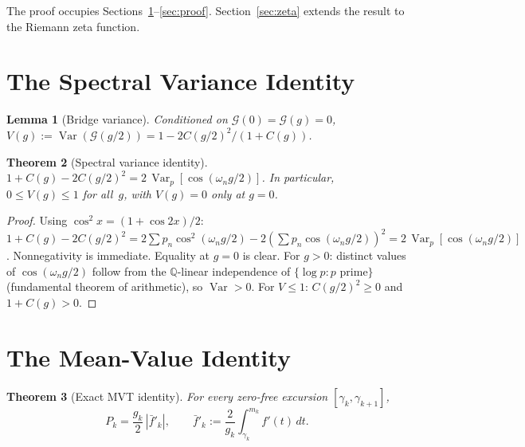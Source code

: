 \documentclass[11pt]{article}
\newtheorem{theorem}{Theorem}
\newtheorem{lemma}[theorem]{Lemma}
\DeclareMathOperator{\Var}{Var}
\begin{document}
The proof occupies Sections~\ref{sec:spectral}--\ref{sec:proof}.
Section~\ref{sec:zeta} extends the result to the Riemann zeta function.


\section{The Spectral Variance Identity}\label{sec:spectral}

\begin{lemma}[Bridge variance]\label{lem:bridge}
Conditioned on $\mathcal{G}(0) = \mathcal{G}(g) = 0$,
$V(g) := \Var(\mathcal{G}(g/2)) = 1 - 2C(g/2)^2/(1+C(g))$.
\end{lemma}

\begin{theorem}[Spectral variance identity]\label{thm:svi}
$1 + C(g) - 2C(g/2)^2 = 2\,\Var_{\!p}[\cos(\omega_n g/2)]$.
In particular, $0 \leq V(g) \leq 1$ for all~$g$, with $V(g) = 0$
only at $g = 0$.
\end{theorem}

\begin{proof}
Using $\cos^2 x = (1{+}\cos 2x)/2$:
$1 + C(g) - 2C(g/2)^2
= 2\sum p_n \cos^2(\omega_n g/2) - 2(\sum p_n \cos(\omega_n g/2))^2
= 2\,\Var_p[\cos(\omega_n g/2)]$.
Nonnegativity is immediate. Equality at $g{=}0$ is clear.
For $g > 0$: distinct values of $\cos(\omega_n g/2)$ follow from
the $\mathbb{Q}$-linear independence of $\{\log p : p\text{ prime}\}$
(fundamental theorem of arithmetic), so $\Var > 0$.
For $V \leq 1$: $C(g/2)^2 \geq 0$ and $1 + C(g) > 0$.
\end{proof}


\section{The Mean-Value Identity}\label{sec:mvt}

\begin{theorem}[Exact MVT identity]\label{thm:mvt}
For every zero-free excursion $[\gamma_k, \gamma_{k+1}]$,
\begin{equation}\label{eq:mvt}
P_k = \frac{g_k}{2}\,|\bar{f}'_k|,
\qquad \bar{f}'_k := \frac{2}{g_k}\int_{\gamma_k}^{m_k} f'(t)\,dt.
\end{equation}
\end{theorem}
\end{document}

